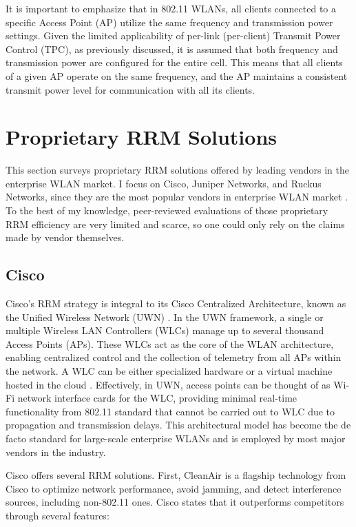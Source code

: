 It is important to emphasize that in 802.11 WLANs, all clients connected to a specific Access Point (AP) utilize the same frequency and transmission power settings. Given the limited applicability of per-link (per-client) Transmit Power Control (TPC), as previously discussed, it is assumed that both frequency and transmission power are configured for the entire cell. This means that all clients of a given AP operate on the same frequency, and the AP maintains a consistent transmit power level for communication with all its clients.


\section {Proprietary RRM Solutions}
\label{chap:lr:sec:prop_rrm}
This section surveys proprietary RRM solutions offered by leading vendors in the enterprise WLAN market. I focus on Cisco, Juniper Networks, and Ruckus Networks, since they are the most popular vendors in enterprise WLAN market \cite{WiFiMarketSize}. To the best of my knowledge, peer-reviewed evaluations of those proprietary RRM efficiency are very limited and scarce, so one could only rely on the claims made by vendor themselves.

\subsection{Cisco}
Cisco's RRM strategy is integral to its Cisco Centralized Architecture, known as the Unified Wireless Network (UWN) \cite{CiscoUnifiedWirelessa}. In the UWN framework, a single or multiple Wireless LAN Controllers (WLCs) manage up to several thousand Access Points (APs). These WLCs act as the core of the WLAN architecture, enabling centralized control and the collection of telemetry from all APs within the network. A WLC can be either specialized hardware or a virtual machine hosted in the cloud \cite{arenaUnderstandingTroubleshootingCisco2022}.
Effectively, in UWN, access points can be thought of as Wi-Fi network interface cards for the WLC, providing minimal real-time functionality from 802.11 standard that cannot be carried out to WLC due to propagation and transmission delays.
This architectural model has become the de facto standard for large-scale enterprise WLANs and is employed by most major vendors in the industry.

Cisco offers several RRM solutions. First, CleanAir is a flagship technology from Cisco \cite{CiscoCleanAirTechnology2014} to optimize network performance, avoid jamming, and detect interference sources, including non-802.11 ones. Cisco states that it outperforms competitors through several features:

